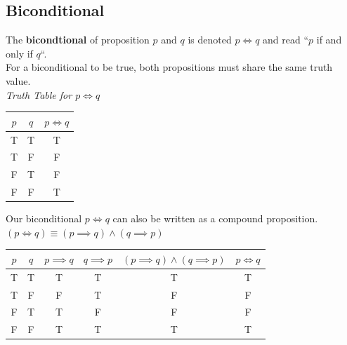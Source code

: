 \documentclass{article}
\begin{document}
\subsection{Biconditional}
The \textbf{bicondtional} of proposition $ p $ and $ q $ is denoted $ p \Longleftrightarrow{} q $ and read ``$ p $ if and only if $ q $``.\\


For a biconditional to be true, both propositions must share the same truth value. \\


\textit{Truth Table for $ p \Longleftrightarrow q $}
\begin{tabular}{|c|c|c|}
\hline
$ p $ & $ q $ & $ p \Longleftrightarrow q $ \\
\hline
T & T & T \\ 
T & F & F \\
F & T & F \\
F & F & T \\
\hline 
\end{tabular}


Our biconditional $ p \Longleftrightarrow q $ can also be written as a compound proposition. \\
$ (p \Longleftrightarrow q) \equiv (p \implies q) \land (q \implies p) $ \\


\begin{tabular}{|c|c|c|c|c|c|}
\hline
$ p $ & $ q $ & $ p \implies q $ & $ q \implies p $ & $ (p \implies q) \land (q \implies p) $ & $ p \Longleftrightarrow q $ \\
\hline
T & T & T & T & T & T \\ 
T & F & F & T & F & F \\
F & T & T & F & F & F \\
F & F & T & T & T & T \\
\hline 
\end{tabular}
\end{document}
